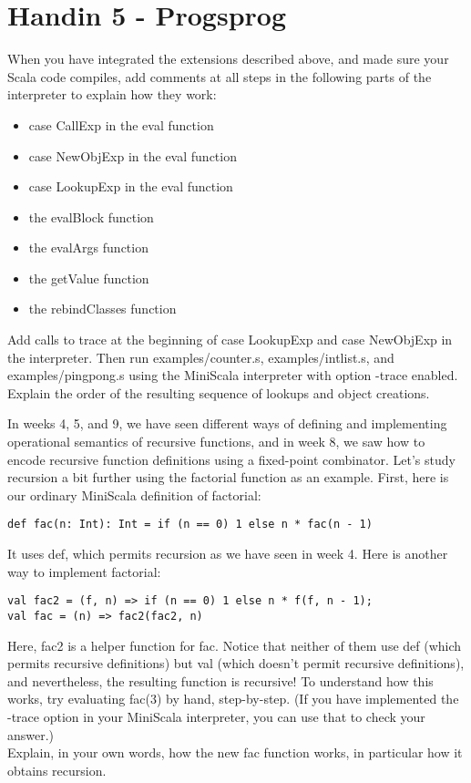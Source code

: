 \documentclass[working, oneside]{../../../../Preambles/tuftebook}
\begin{document}
\let\cleardoublepage\clearpage
\thispagestyle{fancy}
\chapter{Handin 5 - Progsprog}
\begin{exercise}[102]
When you have integrated the extensions described above, and made sure your Scala code compiles, add comments at all steps in the following parts of the interpreter to explain how they work:
\begin{itemize}
    \item case CallExp in the eval function
    \item case NewObjExp in the eval function
    \item case LookupExp in the eval function
    \item the evalBlock function
    \item the evalArgs function
    \item the getValue function
    \item the rebindClasses function
\end{itemize}
\end{exercise}
\begin{exercise}[103]
Add calls to trace at the beginning of case LookupExp and case NewObjExp in the interpreter. Then run examples/counter.s, examples/intlist.s, and examples/pingpong.s using the MiniScala interpreter with option -trace enabled. Explain the order of the resulting sequence of lookups and object creations. 
\end{exercise}
\begin{exercise}[106]
 In weeks 4, 5, and 9, we have seen different ways of defining and implementing operational semantics of recursive functions, and in week 8, we saw how to encode recursive function definitions using a fixed-point combinator. Let's study recursion a bit further using the factorial function as an example. First, here is our ordinary MiniScala definition of factorial:
 \begin{lstlisting}
def fac(n: Int): Int = if (n == 0) 1 else n * fac(n - 1)
 \end{lstlisting}
It uses def, which permits recursion as we have seen in week 4. Here is another way to implement factorial:
\begin{lstlisting}
val fac2 = (f, n) => if (n == 0) 1 else n * f(f, n - 1);
val fac = (n) => fac2(fac2, n)
\end{lstlisting}
Here, fac2 is a helper function for fac. Notice that neither of them use def (which permits recursive definitions) but val (which doesn't permit recursive definitions), and nevertheless, the resulting function is recursive! To understand how this works, try evaluating fac(3) by hand, step-by-step. (If you have implemented the -trace option in your MiniScala interpreter, you can use that to check your answer.)\\
Explain, in your own words, how the new fac function works, in particular how it obtains recursion.
\end{exercise}
\end{document}
